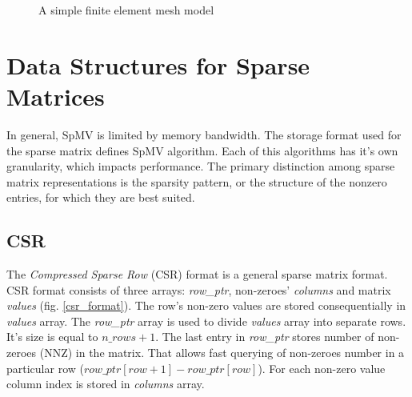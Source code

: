 \documentclass{article}
\begin{document}
\begin{figure}[H]
{
  }
  \caption{A simple finite element mesh model}
  \label{fem_to_sparse_matrix}
\end{figure}

\section{Data Structures for Sparse Matrices}
In general, SpMV is limited by memory bandwidth. The storage format used for the sparse matrix defines SpMV algorithm. Each of this
algorithms has it's own granularity, which impacts performance. The primary distinction among sparse matrix representations is the 
sparsity pattern, or the structure of the nonzero entries, for which they are best suited. 

\subsection{CSR}

The \textit{Compressed Sparse Row} (CSR) format is a general sparse matrix format. CSR format consists of three arrays: \textit{row\_ptr},
non-zeroes' \textit{columns} and matrix \textit{values} (fig. \ref{csr_format}). The row's non-zero values are stored consequentially in \textit{values} array. The \textit{row\_ptr} array
is used to divide \textit{values} array into separate rows. It's size is equal to $n\_rows + 1$. The last entry in \textit{row\_ptr} stores number of non-zeroes (NNZ) in the
matrix. That allows fast querying of non-zeroes number in a particular row ($row\_ptr[row+1] - row\_ptr[row]$).
For each non-zero value column index is stored in 
\textit{columns} array.
\end{document}
